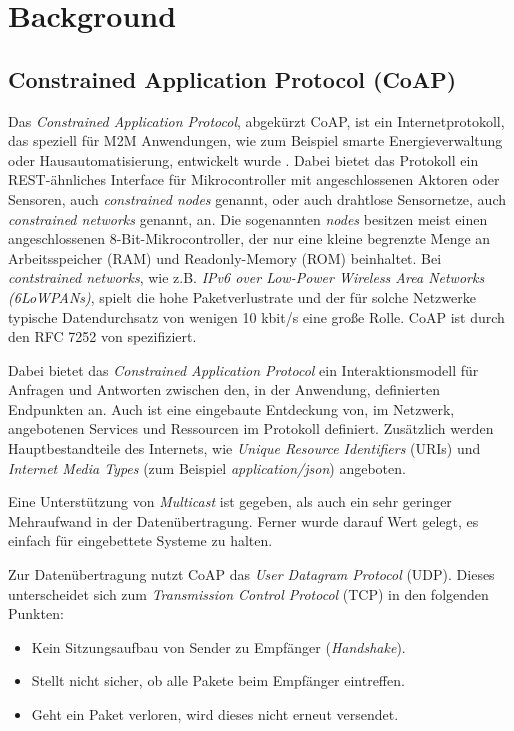 \section{Background}
\label{sec:background}

\subsection{Constrained Application Protocol (CoAP)}
\label{subsec:constrained-application-protocol}

Das \textit{Constrained Application Protocol}, abgekürzt CoAP, ist ein Internetprotokoll, das speziell für M2M Anwendungen, wie zum Beispiel smarte Energieverwaltung oder Hausautomatisierung, entwickelt wurde \autocite{coap}. Dabei bietet das Protokoll ein REST-ähnliches Interface für Mikrocontroller mit angeschlossenen Aktoren oder Sensoren, auch \textit{constrained nodes} genannt, oder auch drahtlose Sensornetze, auch \textit{constrained networks} genannt, an. Die sogenannten \textit{nodes} besitzen meist einen angeschlossenen 8-Bit-Mikrocontroller, der nur eine kleine begrenzte Menge an Arbeitsspeicher (RAM) und Readonly-Memory (ROM) beinhaltet. Bei \textit{contstrained networks}, wie z.B. \textit{IPv6 over Low-Power Wireless Area Networks (6LoWPANs)}, spielt die hohe Paketverlustrate und der für solche Netzwerke typische Datendurchsatz von wenigen 10 kbit/s eine große Rolle. CoAP ist durch den RFC 7252 von \citeauthor{RFC7252} \cite{RFC7252} spezifiziert.

Dabei bietet das \textit{Constrained Application Protocol} ein Interaktionsmodell für Anfragen und Antworten zwischen den, in der Anwendung, definierten Endpunkten an. Auch ist eine eingebaute Entdeckung von, im Netzwerk, angebotenen Services und Ressourcen im Protokoll definiert. Zusätzlich werden Hauptbestandteile des Internets, wie \textit{Unique Resource Identifiers} (URIs) und \textit{Internet Media Types} (zum Beispiel \textit{application/json}) angeboten.

Eine Unterstützung von \textit{Multicast} ist gegeben, als auch ein sehr geringer Mehraufwand in der Datenübertragung. Ferner wurde darauf Wert gelegt, es einfach für eingebettete Systeme zu halten.

Zur Datenübertragung nutzt CoAP das \textit{User Datagram Protocol} (UDP). Dieses unterscheidet sich zum \textit{Transmission Control Protocol} (TCP) in den folgenden Punkten:
\begin{itemize}
    \item Kein Sitzungsaufbau von Sender zu Empfänger (\textit{Handshake}).
    \item Stellt nicht sicher, ob alle Pakete beim Empfänger eintreffen.
    \item Geht ein Paket verloren, wird dieses nicht erneut versendet.
\end{itemize}

